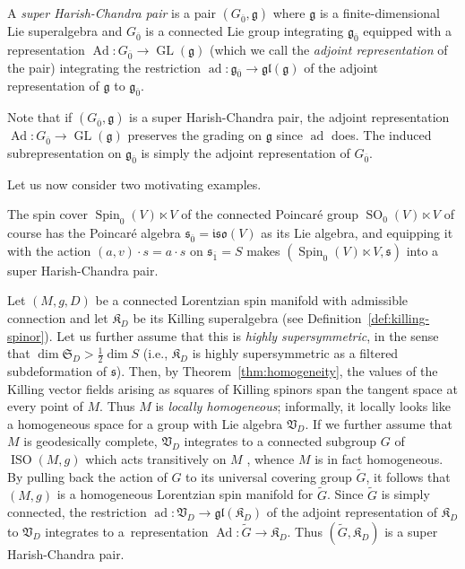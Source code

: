 \documentclass[pdftex]{sigma}
\numberwithin{equation}{section}
\newcommand{\fg}{\mathfrak{g}}
\newcommand{\fs}{\mathfrak{s}}
\newcommand{\fgl}{\mathfrak{gl}}
\newcommand{\fiso}{\mathfrak{iso}}
\newcommand{\fK}{\mathfrak{K}}
\newcommand{\fS}{\mathfrak{S}}
\newcommand{\fV}{\mathfrak{V}}
\newcommand{\1}{\mathbbm{1}}
\DeclareMathOperator{\GL}{GL}
\DeclareMathOperator{\Spin}{Spin}
\DeclareMathOperator{\SO}{SO}
\DeclareMathOperator{\ISO}{ISO}
\DeclareMathOperator{\Ad}{Ad}
\DeclareMathOperator{\ad}{ad}
\begin{document}
\begin{Definition}\label{def:super-Harish-Chandra}
	A \emph{super Harish-Chandra pair} is a pair $(G_{\overline0},\fg)$ where $\fg$ is a finite-dimensional Lie superalgebra and $G_{\overline0}$ is a connected Lie group integrating $\fg_{\overline0}$ equipped with a representation $\Ad\colon G_{\overline0}\to\GL(\fg)$ (which we call the \emph{adjoint representation} of the pair) integrating the restriction $\ad\colon\fg_{\overline0}\to\fgl(\fg)$ of the adjoint representation of $\fg$ to $\fg_{\overline0}$.
\end{Definition}

Note that if $(G_{\overline0},\fg)$ is a super Harish-Chandra pair, the adjoint representation $\Ad\colon G_{\overline0}\to\GL(\fg)$ preserves the grading on $\fg$ since $\ad$ does. The induced subrepresentation on $\fg_{\overline0}$ is simply the adjoint representation of $G_{\overline0}$.

Let us now consider two motivating examples.

\begin{Example}
The spin cover $\Spin_0(V)\ltimes V$ of the connected Poincar\'e group $\SO_0(V)\ltimes V$ of course has the Poincar\'e algebra $\fs_{\overline 0}=\fiso(V)$ as its Lie algebra, and equipping it with the action $(a,v)\cdot s = a\cdot s$ on $\fs_{\overline 1}=S$ makes $(\Spin_0(V)\ltimes V,\fs)$ into a super Harish-Chandra pair.
\end{Example}

\begin{Example}
Let $(M,g,D)$ be a connected Lorentzian spin manifold with admissible connection and let $\fK_D$ be its Killing superalgebra (see Definition~\ref{def:killing-spinor}). Let us further assume that this is \emph{highly supersymmetric}, in the sense that $\dim\fS_D>\frac{1}{2}\dim S$ (i.e., $\fK_D$ is highly supersymmetric as a filtered subdeformation of $\fs$). Then, by Theorem~\ref{thm:homogeneity}, the values of the Killing vector fields arising as squares of Killing spinors span the tangent space at every point of $M$. Thus $M$ is \emph{locally homogeneous}; informally, it locally looks like a homogeneous space for a group with Lie algebra $\fV_D$. If we further assume that $M$ is geodesically complete, $\fV_D$ integrates to a connected subgroup $G$ of $\ISO(M,g)$ which acts transitively on $M$ \cite[Theorem~2.2]{Stehney1980}, whence $M$ is in fact homogeneous. By pulling back the action of $G$ to its universal covering group $\widetilde{G}$, it follows that $(M,g)$ is a homogeneous Lorentzian spin manifold for $\widetilde{G}$. Since $\widetilde{G}$ is simply connected, the restriction $\ad\colon\fV_D\to\fgl(\fK_D)$ of the adjoint representation of $\fK_D$ to $\fV_D$ integrates to a~representation $\Ad\colon\widetilde{G}\to\fK_D$. Thus $(\widetilde{G},\fK_D)$ is a super Harish-Chandra pair.
\end{Example}
\end{document}
